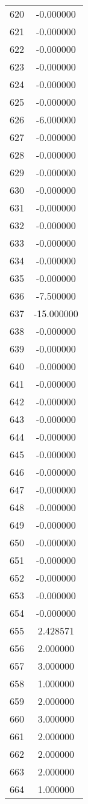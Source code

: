 \documentclass[12pt]{article}
\begin{document}
\begin{longtable}{@{}cc@{}}
620 & -0.000000 \\
621 & -0.000000 \\
622 & -0.000000 \\
623 & -0.000000 \\
624 & -0.000000 \\
625 & -0.000000 \\
626 & -6.000000 \\
627 & -0.000000 \\
628 & -0.000000 \\
629 & -0.000000 \\
630 & -0.000000 \\
631 & -0.000000 \\
632 & -0.000000 \\
633 & -0.000000 \\
634 & -0.000000 \\
635 & -0.000000 \\
636 & -7.500000 \\
637 & -15.000000 \\
638 & -0.000000 \\
639 & -0.000000 \\
640 & -0.000000 \\
641 & -0.000000 \\
642 & -0.000000 \\
643 & -0.000000 \\
644 & -0.000000 \\
645 & -0.000000 \\
646 & -0.000000 \\
647 & -0.000000 \\
648 & -0.000000 \\
649 & -0.000000 \\
650 & -0.000000 \\
651 & -0.000000 \\
652 & -0.000000 \\
653 & -0.000000 \\
654 & -0.000000 \\
655 & 2.428571 \\
656 & 2.000000 \\
657 & 3.000000 \\
658 & 1.000000 \\
659 & 2.000000 \\
660 & 3.000000 \\
661 & 2.000000 \\
662 & 2.000000 \\
663 & 2.000000 \\
664 & 1.000000 \\

\end{longtable}
\end{document}

